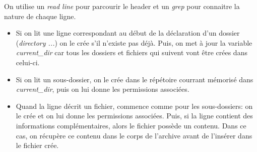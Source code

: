 \documentclass[titlepage]{article}
\begin{document}
	On utilise un \textit{read line} pour parcourir le header et un \textit{grep} pour connaitre la nature de chaque ligne.
	\begin{itemize}
		\item Si on lit une ligne correspondant au début de la déclaration d'un dossier (\textit{directory ...}) on le crée s’il n’existe pas déjà. Puis, on met à jour la variable \textit{current\_dir} car tous les dossiers et fichiers qui suivent vont être crées dans celui-ci.
		\item Si on lit un sous-dossier, on le crée dans le répétoire courrant mémorisé dans \textit{current\_dir}, puis on lui donne les permissions associées. 
		\item Quand la ligne décrit un fichier, commence comme pour les sous-dossiers: on le crée et on lui donne les permissions associées. Puis, si la ligne contient des informations complémentaires, alors le fichier possède un contenu. Dans ce cas, on récupère ce contenu dans le corps de l'archive avant de l'insérer dans le fichier crée.
	\end{itemize}
\end{document}
